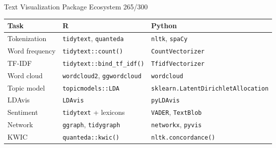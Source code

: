 \documentclass[10pt]{beamer}
\newcommand{\smark}[1]{\hfill{\scriptsize\color{codegray}#1}}
\begin{document}
\begin{frame}{Text Visualization Package Ecosystem}
\smark{265/300}
\centering\small
\begin{tabular}{@{}lll@{}}
    \toprule
    \textbf{Task} & \textbf{R} & \textbf{Python} \\
    \midrule
    Tokenization      & \texttt{tidytext}, \texttt{quanteda}    & \texttt{nltk}, \texttt{spaCy} \\
    Word frequency    & \texttt{tidytext::count()}              & \texttt{CountVectorizer} \\
    TF-IDF            & \texttt{tidytext::bind\_tf\_idf()}      & \texttt{TfidfVectorizer} \\
    Word cloud        & \texttt{wordcloud2}, \texttt{ggwordcloud} & \texttt{wordcloud} \\
    Topic model       & \texttt{topicmodels::LDA}               & \texttt{sklearn.LatentDirichletAllocation} \\
    LDAvis            & \texttt{LDAvis}                         & \texttt{pyLDAvis} \\
    Sentiment         & \texttt{tidytext} + lexicons            & \texttt{VADER}, \texttt{TextBlob} \\
    Network           & \texttt{ggraph}, \texttt{tidygraph}     & \texttt{networkx}, \texttt{pyvis} \\
    KWIC              & \texttt{quanteda::kwic()}               & \texttt{nltk.concordance()} \\
    \bottomrule
\end{tabular}
\end{frame}
\end{document}
